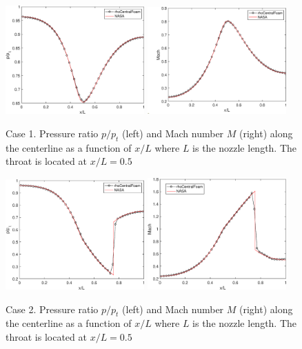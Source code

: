 \documentclass[12pt]{article}
\begin{document}
\begin{figure}
\centering\includegraphics[width=0.475\textwidth]{case1_pratio}
\hfill
\centering\includegraphics[width=0.475\textwidth]{case1_M}
\caption{Case 1. Pressure ratio  $p/p_t$ (left) and Mach number $M$ (right) along the centerline as
a function of $x/L$ where $L$ is the nozzle length.
The throat is located at $x/L=0.5$}
\label{fig:case1_pics}
\end{figure}

\begin{figure}
\centering\includegraphics[width=0.475\textwidth]{case2_pratio}
\hfill
\centering\includegraphics[width=0.475\textwidth]{case2_M}
\caption{Case 2. Pressure ratio  $p/p_t$ (left) and Mach number $M$ (right) along the centerline as
a function of $x/L$ where $L$ is the nozzle length.
The throat is located at $x/L=0.5$}
\label{fig:case1_pics}
\end{figure}
\end{document}
